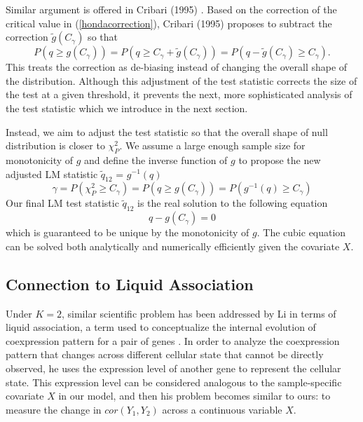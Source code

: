 \documentclass[12pt]{extarticle}
\theoremstyle{theorem}
\begin{document}
\vspace{5mm} \noindent
Similar argument is offered in Cribari (1995) \cite{cribari1995improved}. Based on the correction of the critical value in (\ref{hondacorrection}), Cribari (1995) proposes to subtract the correction $\tilde{g}(C_{\gamma})$ so that
$$P(q  \geq g(C_{\gamma})) = P(q \geq C_{\gamma} + \tilde{g}(C_{\gamma})) = P(q - \tilde{g}(C_{\gamma}) \geq C_{\gamma}).$$
This treats the correction as de-biasing instead of changing the overall shape of the distribution. Although this adjustment of the test statistic corrects the size of the test at a given threshold, it prevents the next, more sophisticated analysis of the test statistic which we introduce in the next section. 

\vspace{5mm} \noindent
Instead, we aim to adjust the test statistic so that the overall shape of null distribution is closer to $\chi_{P}^2$. We assume a large enough sample size for monotonicity of $g$ and define the inverse function of $g$ to propose the new adjusted LM statistic $\tilde{q}_{12}$ = $g^{-1}(q)$
$$\gamma = P(\chi_{P}^2 \geq C_{\gamma}) = P(q \geq g(C_{\gamma})) = P(g^{-1}(q) \geq C_{\gamma})$$
Our final LM test statistic $\tilde{q}_{12}$ is the real solution to the following equation 
$$q - g(C_{\gamma}) = 0$$
which is guaranteed to be unique by the monotonicity of $g$. The cubic equation can be solved both analytically and numerically efficiently given the covariate $X$. 

\subsection{Connection to Liquid Association}
Under $K=2$, similar scientific problem has been addressed by Li in terms of liquid association, a term used to conceptualize the internal evolution of coexpression pattern for a pair of genes \cite{li2002genome}. In order to analyze the coexpression pattern that changes across different cellular state that cannot be directly observed, he uses the expression level of another gene to represent the cellular state. This expression level can be considered analogous to the sample-specific covariate $X$ in our model, and then his problem becomes similar to ours: to measure the change in $cor(Y_1, Y_2)$ across a continuous variable $X$. \\
\end{document}
